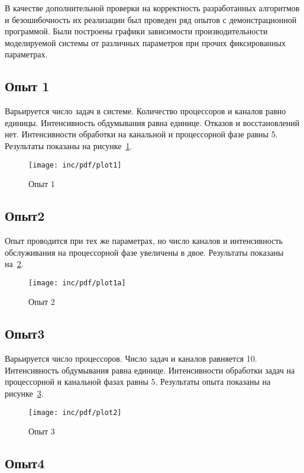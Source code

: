 В качестве дополнительной проверки на корректность разработанных алгоритмов и безошибочность их реализации был проведен ряд опытов с демонстрационной программой. Были построены графики зависимости производительности моделируемой системы от различных параметров при прочих фиксированных параметрах.

\subsection*{Опыт 1}

Варьируется число задач в системе. Количество процессоров и каналов равно единицы. Интенсивность обдумывания равна единице. Отказов и восстановлений нет. Интенсивности обработки на канальной и процессорной фазе равны 5. Результаты показаны на рисунке~\ref{fig:plot1}.

\begin{figure}[ht]
  \centering
  \texttt{[image: inc/pdf/plot1]}
  \caption{Опыт 1}
  \label{fig:plot1}
\end{figure}

\subsection*{Опыт2}

Опыт проводится при тех же параметрах, но число каналов и интенсивность обслуживания на процессорной фазе увеличены в двое. Результаты показаны на~\ref{fig:plot1a}.

\begin{figure}[ht]
  \centering
  \texttt{[image: inc/pdf/plot1a]}
  \caption{Опыт 2}
  \label{fig:plot1a}
\end{figure}


\subsection*{Опыт3}

Варьируется число процессоров. Число задач и каналов равняется 10. Интенсивность обдумывания равна единице. Интенсивности обработки задач на процессорной и канальной фазах равны 5. Результаты опыта показаны на рисунке~\ref{fig:plot2}.

\begin{figure}[ht!]
  \centering
  \texttt{[image: inc/pdf/plot2]}
  \caption{Опыт 3}
  \label{fig:plot2}
\end{figure}

\subsection*{Опыт4}

